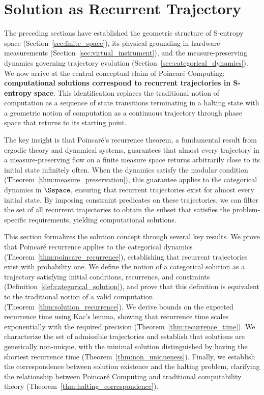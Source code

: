 \section{Solution as Recurrent Trajectory}
\label{sec:solution_trajectory}

The preceding sections have established the geometric structure of S-entropy space (Section~\ref{sec:finite_space}), its physical grounding in hardware measurements (Section~\ref{sec:virtual_instrument}), and the measure-preserving dynamics governing trajectory evolution (Section~\ref{sec:categorical_dynamics}). We now arrive at the central conceptual claim of Poincaré Computing: \textbf{computational solutions correspond to recurrent trajectories in S-entropy space}. This identification replaces the traditional notion of computation as a sequence of state transitions terminating in a halting state with a geometric notion of computation as a continuous trajectory through phase space that returns to its starting point.

The key insight is that Poincaré's recurrence theorem, a fundamental result from ergodic theory and dynamical systems, guarantees that almost every trajectory in a measure-preserving flow on a finite measure space returns arbitrarily close to its initial state infinitely often. When the dynamics satisfy the modular condition (Theorem~\ref{thm:measure_preservation}), this guarantee applies to the categorical dynamics in $\Sspace$, ensuring that recurrent trajectories exist for almost every initial state. By imposing constraint predicates on these trajectories, we can filter the set of all recurrent trajectories to obtain the subset that satisfies the problem-specific requirements, yielding computational solutions.

This section formalizes the solution concept through several key results. We prove that Poincaré recurrence applies to the categorical dynamics (Theorem~\ref{thm:poincare_recurrence}), establishing that recurrent trajectories exist with probability one. We define the notion of a categorical solution as a trajectory satisfying initial conditions, recurrence, and constraints (Definition~\ref{def:categorical_solution}), and prove that this definition is equivalent to the traditional notion of a valid computation (Theorem~\ref{thm:solution_recurrence}). We derive bounds on the expected recurrence time using Kac's lemma, showing that recurrence time scales exponentially with the required precision (Theorem~\ref{thm:recurrence_time}). We characterize the set of admissible trajectories and establish that solutions are generically non-unique, with the minimal solution distinguished by having the shortest recurrence time (Theorem~\ref{thm:non_uniqueness}). Finally, we establish the correspondence between solution existence and the halting problem, clarifying the relationship between Poincaré Computing and traditional computability theory (Theorem~\ref{thm:halting_correspondence}).

